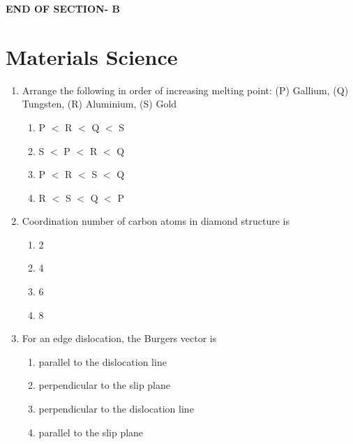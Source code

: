 \documentclass[journal,12pt,onecolumn]{IEEEtran}
\begin{document}
\vspace{3\baselineskip}
\begin{center}
    \item[\textbf{END OF SECTION- B}]
\end{center}

\newpage

\section*{Materials Science}
\vspace{1cm}

\begin{enumerate}[label=\arabic*)]


\item Arrange the following in order of increasing melting point:  
(P) Gallium, (Q) Tungsten, (R) Aluminium, (S) Gold  
\hfill{} \\

\vspace{0.2cm}
\begin{enumerate}[label=\alph*)]
\item P $<$ R $<$ Q $<$ S
\item S $<$ P $<$ R $<$ Q
\item P $<$ R $<$ S $<$ Q
\item R $<$ S $<$ Q $<$ P
\end{enumerate}
\vspace{0.5cm}

\item Coordination number of carbon atoms in diamond structure is  
\hfill{} \\

\vspace{0.2cm}
\begin{enumerate}[label=\alph*)]
\item 2
\item 4
\item 6
\item 8
\end{enumerate}
\vspace{0.5cm}

\item For an edge dislocation, the Burgers vector is  
\hfill{} \\

\vspace{0.2cm}
\begin{enumerate}[label=\alph*)]
\item parallel to the dislocation line
\item perpendicular to the slip plane
\item perpendicular to the dislocation line
\item parallel to the slip plane
\end{enumerate}
\vspace{0.5cm}


\end{enumerate}
\end{document}
